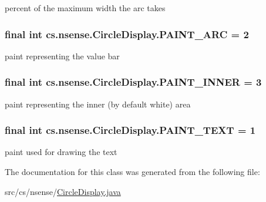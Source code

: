 percent of the maximum width the arc takes \hypertarget{classcs_1_1nsense_1_1_circle_display_a34329310fb725ecb64e1a38f64310349}{
\subsubsection[{P\-A\-I\-N\-T\-\_\-\-A\-R\-C}]{\setlength{\rightskip}{0pt plus 5cm}final int cs.\-nsense.\-Circle\-Display.\-P\-A\-I\-N\-T\-\_\-\-A\-R\-C = 2\hspace{0.3cm}{\ttfamily [static]}}}\label{classcs_1_1nsense_1_1_circle_display_a34329310fb725ecb64e1a38f64310349}
paint representing the value bar \hypertarget{classcs_1_1nsense_1_1_circle_display_aac680b4b8e9add29178a812efbf267f6}{
\subsubsection[{P\-A\-I\-N\-T\-\_\-\-I\-N\-N\-E\-R}]{\setlength{\rightskip}{0pt plus 5cm}final int cs.\-nsense.\-Circle\-Display.\-P\-A\-I\-N\-T\-\_\-\-I\-N\-N\-E\-R = 3\hspace{0.3cm}{\ttfamily [static]}}}\label{classcs_1_1nsense_1_1_circle_display_aac680b4b8e9add29178a812efbf267f6}
paint representing the inner (by default white) area \hypertarget{classcs_1_1nsense_1_1_circle_display_a3fd835443f832fd142d81cfa86aeb3ab}{
\subsubsection[{P\-A\-I\-N\-T\-\_\-\-T\-E\-X\-T}]{\setlength{\rightskip}{0pt plus 5cm}final int cs.\-nsense.\-Circle\-Display.\-P\-A\-I\-N\-T\-\_\-\-T\-E\-X\-T = 1\hspace{0.3cm}{\ttfamily [static]}}}\label{classcs_1_1nsense_1_1_circle_display_a3fd835443f832fd142d81cfa86aeb3ab}
paint used for drawing the text 

The documentation for this class was generated from the following file\-:\begin{DoxyCompactItemize}
\item 
src/cs/nsense/\hyperlink{_circle_display_8java}{Circle\-Display.\-java}\end{DoxyCompactItemize}
